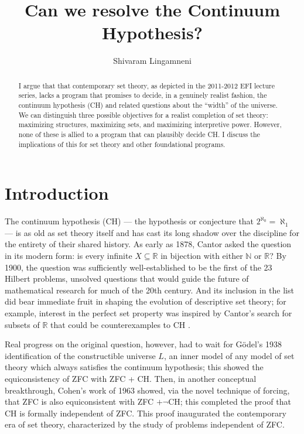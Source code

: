 \documentclass[letterpaper,12pt]{article}
\newcommand{\N}{\mathbb{N}}
\newcommand{\R}{\mathbb{R}}
\begin{document}


\title{Can we resolve the Continuum Hypothesis?}
\author{Shivaram Lingamneni}
\maketitle


\begin{abstract}
I argue that that contemporary set theory, as depicted in the 2011-2012 EFI lecture series, lacks a program that promises to decide, in a genuinely realist fashion, the continuum hypothesis (CH) and related questions about the ``width'' of the universe. We can distinguish three possible objectives for a realist completion of set theory: maximizing structures, maximizing sets, and maximizing interpretive power. However, none of these is allied to a program that can plausibly decide CH. I discuss the implications of this for set theory and other foundational programs.
\end{abstract}

\section{Introduction}
The continuum hypothesis (CH) --- the hypothesis or conjecture that $2^{\aleph_0} = \aleph_1$ --- is as old as set theory itself and has cast its long shadow over the discipline for the entirety of their shared history. As early as 1878, Cantor asked the question in its modern form: is every infinite $X \subseteq \R$ in bijection with either $\N$ or $\R$? By 1900, the question was sufficiently well-established to be the first of the 23 Hilbert problems, unsolved questions that would guide the future of mathematical research for much of the 20th century. And its inclusion in the list did bear immediate fruit in shaping the evolution of descriptive set theory; for example, interest in the perfect set property was inspired by Cantor's search for subsets of $\mathbb{R}$ that could be counterexamples to CH \citep{kanamori2008higher}.

Real progress on the original question, however, had to wait for G\"odel's 1938 identification of the constructible universe $L$, an inner model of any model of set theory which always satisfies the continuum hypothesis; this showed the equiconsistency of ZFC with ZFC + CH. Then, in another conceptual breakthrough, Cohen's work of 1963 showed, via the novel technique of forcing, that ZFC is also equiconsistent with ZFC $+ \neg \mathrm{CH}$; this completed the proof that CH is formally independent of ZFC. This proof inaugurated the contemporary era of set theory, characterized by the study of problems independent of ZFC.
\end{document}
